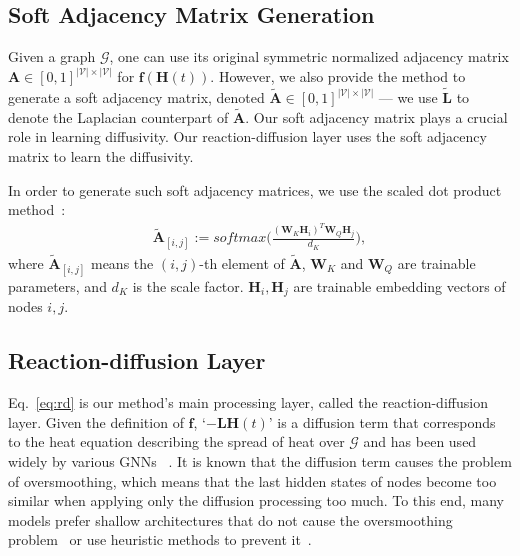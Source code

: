 \documentclass{article}
\theoremstyle{plain}
\theoremstyle{definition}
\theoremstyle{remark}
\begin{document}
\subsection{Soft Adjacency Matrix Generation}
Given a graph $\mathcal{G}$, one can use its original symmetric normalized adjacency matrix $\mathbf{A} \in [0,1]^{|\mathcal{V}| \times |\mathcal{V}|}$ for $\mathbf{f}(\mathbf{H}(t))$. However, we also provide the method to generate a soft adjacency matrix, denoted $\tilde{\mathbf{A}} \in [0,1]^{|\mathcal{V}| \times |\mathcal{V}|}$ --- we use $\tilde{\mathbf{L}}$ to denote the Laplacian counterpart of $\tilde{\mathbf{A}}$. Our soft adjacency matrix plays a crucial role in learning diffusivity. Our reaction-diffusion layer uses the soft adjacency matrix to learn the diffusivity.

In order to generate such soft adjacency matrices, we use the scaled dot product method~\cite{vaswani2017attention}:
\begin{align}
    \tilde{\mathbf{A}}_{[i,j]} := softmax\Big(\frac{(\mathbf{W}_K\mathbf{H}_i)^T\mathbf{W}_Q\mathbf{H}_j}{d_K}\Big)\label{eq:soft},
\end{align}where $\tilde{\mathbf{A}}_{[i,j]}$ means the $(i,j)$-th element of $\tilde{\mathbf{A}}$, $\mathbf{W}_K$ and $\mathbf{W}_Q$ are trainable parameters, and $d_K$ is the scale factor. $\mathbf{H}_i, \mathbf{H}_j$ are trainable embedding vectors of nodes $i, j$.

\subsection{Reaction-diffusion Layer}
Eq.~\eqref{eq:rd} is our method's main processing layer, called the reaction-diffusion layer. Given the definition of $\mathbf{f}$, `$-\mathbf{L}\mathbf{H}(t)$' is a diffusion term that corresponds to the heat equation describing the spread of heat over $\mathcal{G}$ and has been used widely by various GNNs ~\cite{wang2021dgc,choi2021ltocf,chamberlain2021grand}. It is known that the diffusion term causes the problem of oversmoothing, which means that the last hidden states of nodes become too similar when applying only the diffusion processing too much. To this end, many models prefer shallow architectures that do not cause the oversmoothing problem~\cite{Wu2019SGC,kipf2017GCN} or use heuristic methods to prevent it~\cite{zhao2020pairnorm,Chen2018FastGCN,chen2020gcnii,li2019deepgcns,liu2020towards,huang2018adaptivesample,chen2018stochastictraining}.
\end{document}
